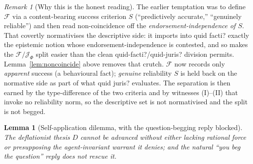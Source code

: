 \documentclass{amsart}
\theoremstyle{definition}
\theoremstyle{plain}
\newtheorem{lemma}{Lemma}
\theoremstyle{remark}
\newtheorem{remark}{Remark}
\begin{document}
\begin{remark}[Why this is the honest reading]\label{rem:behavioural}
The earlier temptation was to define $\mathcal{F}$ via a content-bearing
success criterion $S$ (``predictively accurate,'' ``genuinely reliable'') and
then read non-coincidence off the \emph{endorsement-independence of $S$}. That
covertly normativises the descriptive side: it imports into quid facti? exactly
the epistemic notion whose endorsement-independence is contested, and so makes
the $\mathcal{F}/\mathcal{J}_\Phi$ split easier than the clean
quid-facti?/quid-juris? division permits. Lemma~\ref{lem:noncoincide} above
removes that crutch. $\mathcal{F}$ now records only \emph{apparent} success
(a behavioural fact); \emph{genuine} reliability $S$ is held back on the
normative side as part of what quid juris? evaluates. The separation is then
earned by the type-difference of the two criteria and by witnesses (I)--(II)
that invoke no reliability norm, so the descriptive set is not normativised and
the split is not begged.
\end{remark}

\begin{lemma}[Self-application dilemma, with the question-begging reply blocked]
\label{lem:selfapp}
The deflationist thesis $D$ cannot be advanced without either lacking rational
force or presupposing the agent-invariant warrant it denies; and the natural
``you beg the question'' reply does not rescue it.
\end{lemma}
\end{document}
